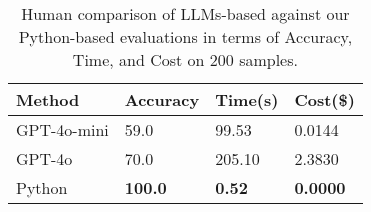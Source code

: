 \begin{table}[t]
    \small
    \centering
    \begin{tabular}{l|lll}
    \toprule
        Method & Accuracy  &  Time(s) & Cost(\$)  \\
        \midrule
        GPT-4o-mini & 59.0  & 99.53  & 0.0144\\ 
        GPT-4o & 70.0 & 205.10  & 2.3830 \\ 
        \midrule
        Python  & \textbf{100.0 }  & \textbf{0.52} & \textbf{0.0000} \\ 
        
    \bottomrule
    \end{tabular}
     \caption{Human comparison of LLMs-based against our Python-based evaluations in terms of Accuracy, Time, and Cost on 200 samples.}
     \label{tab:gpt4omini}
\end{table}